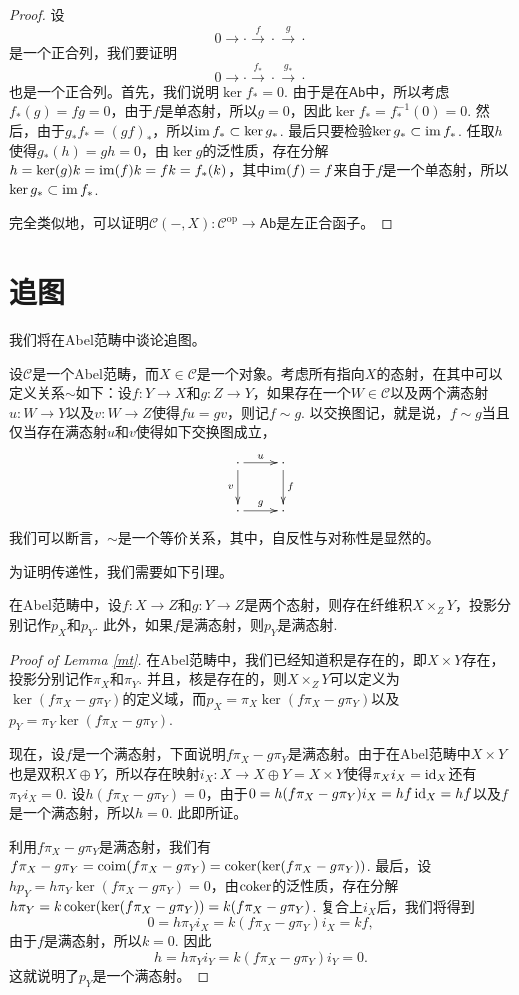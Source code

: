 \begin{proof}
	设
	\[
		0\to\cdot \xrightarrow{f}\cdot \xrightarrow{g}\cdot
	\]
	是一个正合列，我们要证明
	\[
	0\to \cdot \xrightarrow{f_*}\cdot \xrightarrow{g_*}\cdot
	\]
	也是一个正合列。首先，我们说明$\ker f_*=0$. 由于是在$\mathsf{Ab}$中，所以考虑$f_*(g)=fg=0$，由于$f$是单态射，所以$g=0$，因此$\ker f_*=f_*^{-1}(0)=0$. 然后，由于$g_*f_*=(gf)_*$，所以$\operatorname{im} f_*\subset \ker g_*$. 最后只要检验$\ker g_*\subset \operatorname{im} f_*$. 任取$h$使得$g_*(h)=gh=0$，由$\ker g$的泛性质，存在分解$h=\ker(g)k=\operatorname{im}(f)k=fk=f_*(k)$，其中$\operatorname{im}(f)=f$来自于$f$是一个单态射，所以$\ker g_* \subset \operatorname{im} f_*$.

	完全类似地，可以证明$\mathcal{C}(-,X):\mathcal{C}^\text{op} \to \mathsf{Ab}$是左正合函子。
\end{proof}

\section{追图}

我们将在Abel范畴中谈论追图。

\begin{lem}\label{zhuitu}
设$\mathcal{C}$是一个Abel范畴，而$X\in \mathcal{C}$是一个对象。考虑所有指向$X$的态射，在其中可以定义关系$\sim$如下：设$f:Y\to X$和$g:Z\to Y$，如果存在一个$W\in \mathcal{C}$以及两个满态射$u:W\to Y$以及$v:W\to Z$使得$fu=gv$，则记$f\sim g$. 以交换图记，就是说，$f\sim g$当且仅当存在满态射$u$和$v$使得如下交换图成立，
\[
\xymatrix{
	\cdot \ar[r]^u \ar[d]_v & \cdot\ar[d]^f\\
	\cdot \ar[r]^g & \cdot
}
\]
我们可以断言，$\sim$是一个等价关系，其中，自反性与对称性是显然的。
\end{lem}

为证明传递性，我们需要如下引理。

\begin{lem}\label{mt}
	在Abel范畴中，设$f:X\to Z$和$g:Y\to Z$是两个态射，则存在纤维积$X\times_Z Y$，投影分别记作$p_X$和$p_Y$. 此外，如果$f$是满态射，则$p_Y$是满态射.
\end{lem}

\begin{proof}[Proof of Lemma \ref{mt}]
	在Abel范畴中，我们已经知道积是存在的，即$X\times Y$存在，投影分别记作$\pi_X$和$\pi_Y$. 并且，核是存在的，则$X\times_Z Y$可以定义为$\ker(f\pi_X-g\pi_Y)$的定义域，而$p_X=\pi_X\ker(f\pi_X-g\pi_Y)$以及$p_Y=\pi_Y\ker(f\pi_X-g\pi_Y)$.

	现在，设$f$是一个满态射，下面说明$f\pi_X-g\pi_Y$是满态射。由于在Abel范畴中$X\times Y$也是双积$X\oplus Y$，所以存在映射$i_X:X\to X\oplus Y=X\times Y$使得$\pi_Xi_X=\operatorname{id}_X$还有$\pi_Yi_X=0$. 设$h(f\pi_X-g\pi_Y)=0$，由于$0=h(f\pi_X-g\pi_Y)i_X=hf\operatorname{id}_X=hf$以及$f$是一个满态射，所以$h=0$. 此即所证。

	利用$f\pi_X-g\pi_Y$是满态射，我们有$f\pi_X-g\pi_Y=\operatorname{coim}(f\pi_X-g\pi_Y)=\operatorname{coker}(\ker(f\pi_X-g\pi_Y))$. 最后，设$hp_Y=h\pi_Y\ker(f\pi_X-g\pi_Y)=0$，由$\operatorname{coker}$的泛性质，存在分解$h\pi_Y=k\operatorname{coker}(\ker(f\pi_X-g\pi_Y))=k(f\pi_X-g\pi_Y)$. 复合上$i_X$后，我们将得到
	\[
	0=h\pi_Yi_X=k(f\pi_X-g\pi_Y)i_X=kf,
	\]
	由于$f$是满态射，所以$k=0$. 因此
	\[
	h=h\pi_Yi_Y=k(f\pi_X-g\pi_Y)i_Y=0.
	\]
	这就说明了$p_Y$是一个满态射。
\end{proof}

